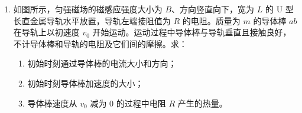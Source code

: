 \documentclass[\gkver]{gaokaozhenti}
\begin{document}
\begin{enumerate}
{\begin{enumerate}
	解得 $x_{0}=-\frac{b}{2k}$，$y_{0}=-\frac{b^{2}}{4k}$。

	则在 $O'xy$ 坐标系中钢球做平抛运动的抛出点坐标为 $\left(-\frac{b}{2k},-\frac{b^{2}}{4k}\right)$。
\end{enumerate}
}
\item
如图所示，匀强磁场的磁感应强度大小为 $B$、方向竖直向下，宽为 $L$ 的 U 型长直金属导轨水平放置，导轨左端接阻值为 $R$ 的电阻。质量为 $m$ 的导体棒 $ab$ 在导轨上以初速度 $v_{0}$ 开始运动。运动过程中导体棒与导轨垂直且接触良好，不计导体棒和导轨的电阻及它们间的摩擦。求：
\begin{enumerate}
	\item
	初始时刻通过导体棒的电流大小和方向；
	\item
	初始时刻导体棒加速度的大小；
	\item
	导体棒速度从 $v_{0}$ 减为 $0$ 的过程中电阻 $R$ 产生的热量。
\end{enumerate}
\onepicture[align=right, w=5.42cm]{}
\end{enumerate}
\end{document}
